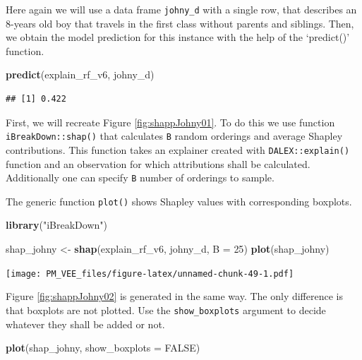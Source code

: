 \documentclass[12pt,]{krantz}
\newenvironment{Shaded}{\begin{snugshade}}{\end{snugshade}}
\newcommand{\DataTypeTok}[1]{\textcolor[rgb]{0.13,0.29,0.53}{#1}}
\newcommand{\DecValTok}[1]{\textcolor[rgb]{0.00,0.00,0.81}{#1}}
\newcommand{\KeywordTok}[1]{\textcolor[rgb]{0.13,0.29,0.53}{\textbf{#1}}}
\newcommand{\NormalTok}[1]{#1}
\newcommand{\OtherTok}[1]{\textcolor[rgb]{0.56,0.35,0.01}{#1}}
\newcommand{\StringTok}[1]{\textcolor[rgb]{0.31,0.60,0.02}{#1}}
\theoremstyle{definition}
\theoremstyle{definition}
\theoremstyle{definition}
\theoremstyle{remark}
\begin{document}
Here again we will use a data frame \texttt{johny\_d} with a single row,
that describes an 8-years old boy that travels in the first class
without parents and siblings. Then, we obtain the model prediction for
this instance with the help of the `predict()' function.

\begin{Shaded}
\begin{Highlighting}[]
\KeywordTok{predict}\NormalTok{(explain_rf_v6, johny_d)}
\end{Highlighting}
\end{Shaded}

\begin{verbatim}
## [1] 0.422
\end{verbatim}

First, we will recreate Figure \ref{fig:shappJohny01}. To do this we use
function \texttt{iBreakDown::shap()} that calculates \texttt{B} random
orderings and average Shapley contributions. This function takes an
explainer created with \texttt{DALEX::explain()} function and an
observation for which attributions shall be calculated. Additionally one
can specify \texttt{B} number of orderings to sample.

The generic function \texttt{plot()} shows Shapley values with
corresponding boxplots.

\begin{Shaded}
\begin{Highlighting}[]
\KeywordTok{library}\NormalTok{(}\StringTok{"iBreakDown"}\NormalTok{)}

\NormalTok{shap_johny <-}\StringTok{ }\KeywordTok{shap}\NormalTok{(explain_rf_v6, johny_d, }\DataTypeTok{B =} \DecValTok{25}\NormalTok{)}
\KeywordTok{plot}\NormalTok{(shap_johny) }
\end{Highlighting}
\end{Shaded}

\texttt{[image: PM\_VEE\_files/figure-latex/unnamed-chunk-49-1.pdf]}

Figure \ref{fig:shappJohny02} is generated in the same way. The only
difference is that boxplots are not plotted. Use the
\texttt{show\_boxplots} argument to decide whatever they shall be added
or not.

\begin{Shaded}
\begin{Highlighting}[]
\KeywordTok{plot}\NormalTok{(shap_johny, }\DataTypeTok{show_boxplots =} \OtherTok{FALSE}\NormalTok{) }
\end{Highlighting}
\end{Shaded}
\end{document}
